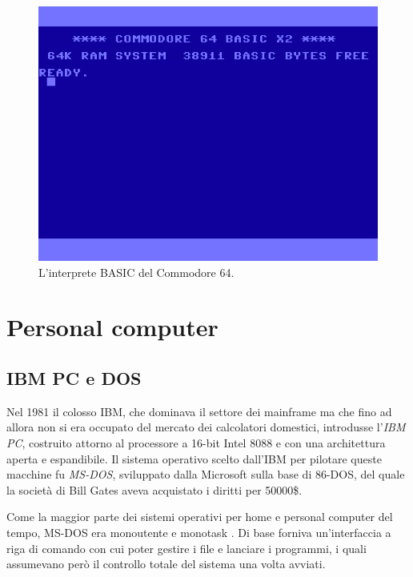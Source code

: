 \documentclass[12pt,a4paper]{report}
\begin{document}
		\begin{figure}[htbp]
		\centering
		\includegraphics[scale=0.5]{img/commodore64.png}
		\caption{L'interprete BASIC del Commodore 64.\label{fig:commodore64}}
		\end{figure}
		
	\section{Personal computer}
		\subsection{IBM PC e DOS}
			Nel 1981 il colosso IBM, che dominava il settore dei mainframe ma che fino ad allora non si era occupato del mercato
			dei calcolatori domestici, introdusse l'\emph{IBM PC}, costruito attorno al processore a 16-bit Intel 8088 e con una
			architettura aperta e espandibile. Il sistema operativo scelto dall'IBM per pilotare queste macchine fu \emph{MS-DOS}, sviluppato
			dalla Microsoft sulla base di 86-DOS, del quale la società di Bill Gates aveva acquistato i diritti per 50000\$.
		
			Come la maggior parte dei sistemi operativi per home e personal computer del tempo, MS-DOS era monoutente
			e monotask \cite{WIKI_MS-DOS}. Di base forniva un'interfaccia a riga di comando con cui poter gestire i file
			e lanciare i programmi, i quali assumevano però il controllo totale del sistema una volta avviati.
			
\end{document}
